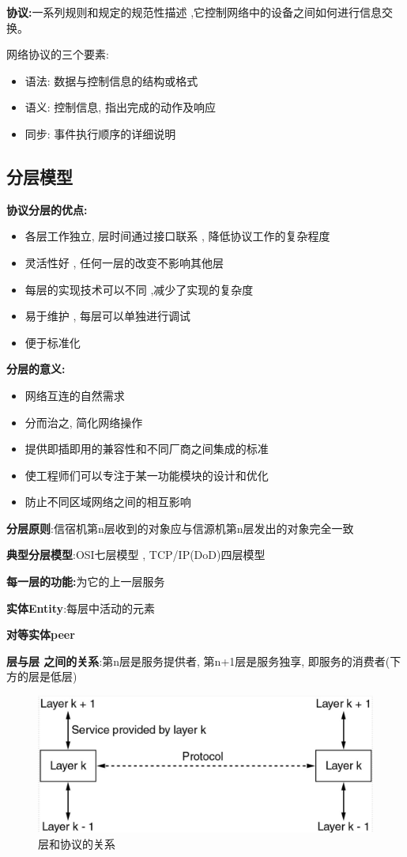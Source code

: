 \documentclass[UTF8,a4paper]{ctexart}
\begin{document}
  \textbf{协议:}一系列规则和规定的规范性描述 ,它控制网络中的设备之间如何进行信息交换。

  网络协议的三个要素:
  \begin{itemize}
    \item 语法: 数据与控制信息的结构或格式
    \item 语义: 控制信息, 指出完成的动作及响应
    \item 同步: 事件执行顺序的详细说明
  \end{itemize}

  \subsection{分层模型}

  \textbf{协议分层的优点:}
  \begin{itemize}
    \item 各层工作独立, 层时间通过接口联系 , 降低协议工作的复杂程度
    \item 灵活性好 , 任何一层的改变不影响其他层
    \item 每层的实现技术可以不同 ,减少了实现的复杂度
    \item 易于维护 , 每层可以单独进行调试
    \item 便于标准化
  \end{itemize}

  \textbf{分层的意义:}
  \begin{itemize}
    \item 网络互连的自然需求
    \item 分而治之, 简化网络操作
    \item 提供即插即用的兼容性和不同厂商之间集成的标准
    \item 使工程师们可以专注于某一功能模块的设计和优化
    \item 防止不同区域网络之间的相互影响
  \end{itemize}

  \textbf{分层原则}:信宿机第n层收到的对象应与信源机第n层发出的对象完全一致

  \textbf{典型分层模型}:OSI七层模型 , TCP/IP(DoD)四层模型

  \textbf{每一层的功能:}为它的上一层服务

  \textbf{实体Entity}:每层中活动的元素

  \textbf{对等实体peer}

  \textbf{层与层 之间的关系}:第n层是服务提供者, 第n+1层是服务独享, 即服务的消费者(下方的层是低层)
  \begin{figure}[H]
    \centering
    \includegraphics[scale = 0.3]{assets/jisuanjiwangluo_ce243.png}
    \caption{层和协议的关系}
  \end{figure}
\end{document}
